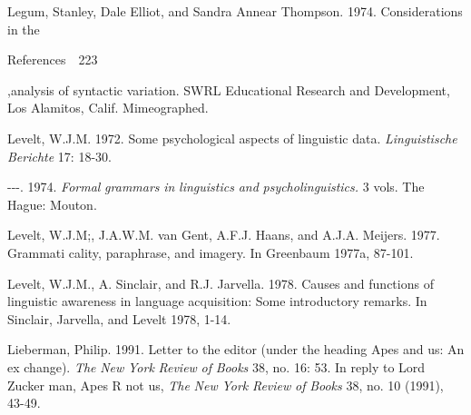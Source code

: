 \begin{styleStandard}
Legum, Stanley, Dale Elliot, and Sandra Annear Thompson. 1974. Considerations in the
\end{styleStandard}


\clearpage\setcounter{page}{1}\begin{styleStandard}
References\ \ 223
\end{styleStandard}


\begin{styleStandard}
,analysis of syntactic variation. SWRL Educational Research and Development, Los Alamitos, Calif. Mimeographed.
\end{styleStandard}


\begin{styleStandard}
Levelt, W.J.M. 1972. Some psychological aspects of linguistic data. \textit{Linguistische}\textit{ }\textit{Berichte}\textit{ }17: 18-30.
\end{styleStandard}


\begin{styleStandard}
{}-{}-{}-. 1974. \textit{Formal}\textit{ }\textit{grammars}\textit{ }\textit{in}\textit{ }\textit{linguistics}\textit{ }\textit{and}\textit{ }\textit{psycholinguistics.}\textit{ }3 vols. The Hague: Mouton.
\end{styleStandard}


\begin{styleStandard}
Levelt, W.J.M;, J.A.W.M. van Gent, A.F.J. Haans, and A.J.A. Meijers. 1977. Grammati\- cality, paraphrase, and imagery. In Greenbaum 1977a, 87-101.
\end{styleStandard}


\begin{styleStandard}
Levelt, W.J.M., A. Sinclair, and R.J. Jarvella. 1978. Causes and functions of linguistic awareness in language acquisition: Some introductory remarks. In Sinclair, Jarvella, and Levelt 1978, 1-14.
\end{styleStandard}


\begin{styleStandard}
Lieberman, Philip. 1991. Letter to the editor (under the heading Apes and us: An ex\- change). \textit{The}\textit{ }\textit{New}\textit{ }\textit{York}\textit{ }\textit{Review}\textit{ }\textit{of}\textit{ }\textit{Books}\textit{ }38, no. 16: 53. In reply to Lord Zucker\- man, Apes R not us, \textit{The}\textit{ }\textit{New}\textit{ }\textit{York}\textit{ }\textit{Review}\textit{ }\textit{of}\textit{ }\textit{Books}\textit{ }38, no. 10 (1991), 43-49.
\end{styleStandard}



